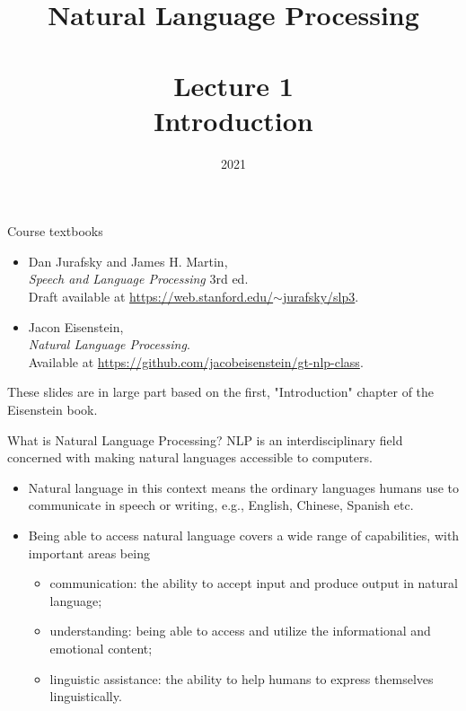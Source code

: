 \documentclass[style=upen, size=14pt]{powerdot}
\newcommand{\gold}{\color{arany}}
\begin{document}
\title{Natural Language Processing\\~~\\Lecture 1\\Introduction}

\date{2021}
\maketitle

\begin{slide}{Course textbooks}
  \pause
  \begin{itemize}
  \item  Dan Jurafsky and James H. Martin,\\
    \emph{Speech and Language Processing} 3rd ed.\\
    Draft available at \href{https://web.stanford.edu/~jurafsky/slp3}{https://web.stanford.edu/$\sim$jurafsky/slp3}.\pause
  \item Jacon Eisenstein,\\
    \emph{Natural Language Processing}.\\
    Available at
    \href{https://github.com/jacobeisenstein/gt-nlp-class}{https://github.com/jacobeisenstein/gt-nlp-class}.
  \end{itemize}\pause
  These slides are in large part based on the first, "Introduction" chapter of
  the Eisenstein book.
\end{slide}

\begin{slide}[toc=What is NLP?]{What is Natural Language Processing?}
  {\gold NLP} is an interdisciplinary field concerned with making natural
  languages accessible to computers.\pause
  \begin{itemize}
  \item {\gold Natural language} in this context means the ordinary
    languages humans use to communicate in speech or writing, e.g., English,
    Chinese, Spanish etc.\pause
  \item Being able to {\gold access} natural language covers a wide range
    of capabilities, with important areas being\pause
    \begin{itemize}
    \item {\gold communication}: the ability to accept input and produce
      output in natural language;\pause
    \item {\gold understanding}: being able to access and utilize the
      informational and emotional content;\pause
    \item {\gold linguistic assistance}: the ability to help humans to
      express themselves linguistically.
    \end{itemize}
  \end{itemize}
\end{slide}
\end{document}
